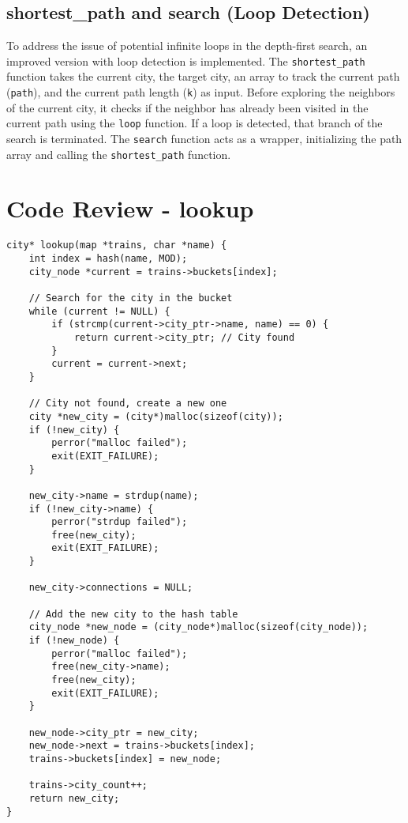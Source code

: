 \documentclass[a4paper,11pt]{article}
\begin{document}
\subsection*{shortest\_path and search (Loop Detection)}
To address the issue of potential infinite loops in the depth-first search, an improved version with loop detection is implemented. The \texttt{shortest\_path} function takes the current city, the target city, an array to track the current path (\texttt{path}), and the current path length (\texttt{k}) as input. Before exploring the neighbors of the current city, it checks if the neighbor has already been visited in the current path using the \texttt{loop} function. If a loop is detected, that branch of the search is terminated. The \texttt{search} function acts as a wrapper, initializing the path array and calling the \texttt{shortest\_path} function.

\section*{Code Review - lookup}

\begin{verbatim}
city* lookup(map *trains, char *name) {
    int index = hash(name, MOD);
    city_node *current = trains->buckets[index];

    // Search for the city in the bucket
    while (current != NULL) {
        if (strcmp(current->city_ptr->name, name) == 0) {
            return current->city_ptr; // City found
        }
        current = current->next;
    }

    // City not found, create a new one
    city *new_city = (city*)malloc(sizeof(city));
    if (!new_city) {
        perror("malloc failed");
        exit(EXIT_FAILURE);
    }

    new_city->name = strdup(name);
    if (!new_city->name) {
        perror("strdup failed");
        free(new_city);
        exit(EXIT_FAILURE);
    }

    new_city->connections = NULL;

    // Add the new city to the hash table
    city_node *new_node = (city_node*)malloc(sizeof(city_node));
    if (!new_node) {
        perror("malloc failed");
        free(new_city->name);
        free(new_city);
        exit(EXIT_FAILURE);
    }

    new_node->city_ptr = new_city;
    new_node->next = trains->buckets[index];
    trains->buckets[index] = new_node;

    trains->city_count++;
    return new_city;
}
\end{verbatim}
\end{document}
